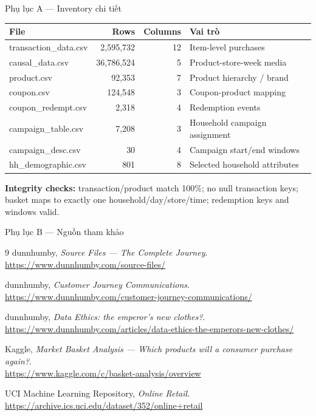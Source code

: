 \documentclass[aspectratio=169,11pt]{beamer}
\begin{document}
\begin{frame}{Phụ lục A --- Inventory chi tiết}
  \scriptsize
  \begin{tabular}{lrrl}
    \toprule
    File & Rows & Columns & Vai trò \\
    \midrule
    transaction\_data.csv & 2,595,732 & 12 & Item-level purchases \\
    causal\_data.csv & 36,786,524 & 5 & Product-store-week media \\
    product.csv & 92,353 & 7 & Product hierarchy / brand \\
    coupon.csv & 124,548 & 3 & Coupon-product mapping \\
    coupon\_redempt.csv & 2,318 & 4 & Redemption events \\
    campaign\_table.csv & 7,208 & 3 & Household campaign assignment \\
    campaign\_desc.csv & 30 & 4 & Campaign start/end windows \\
    hh\_demographic.csv & 801 & 8 & Selected household attributes \\
    \bottomrule
  \end{tabular}
  \vspace{0.4cm}
  \textbf{Integrity checks:} transaction/product match 100\%; no null transaction keys;
  basket maps to exactly one household/day/store/time; redemption keys and windows valid.
\end{frame}

\begin{frame}{Phụ lục B --- Nguồn tham khảo}
  \footnotesize
  \begin{thebibliography}{9}
      dunnhumby, \emph{Source Files --- The Complete Journey}.\\
      \url{https://www.dunnhumby.com/source-files/}

      dunnhumby, \emph{Customer Journey Communications}.\\
      \url{https://www.dunnhumby.com/customer-journey-communications/}

      dunnhumby, \emph{Data Ethics: the emperor's new clothes?}.\\
      \url{https://www.dunnhumby.com/articles/data-ethics-the-emperors-new-clothes/}

      Kaggle, \emph{Market Basket Analysis --- Which products will a consumer purchase again?}.\\
      \url{https://www.kaggle.com/c/basket-analysis/overview}

      UCI Machine Learning Repository, \emph{Online Retail}.\\
      \url{https://archive.ics.uci.edu/dataset/352/online+retail}
  \end{thebibliography}
\end{frame}
\end{document}
